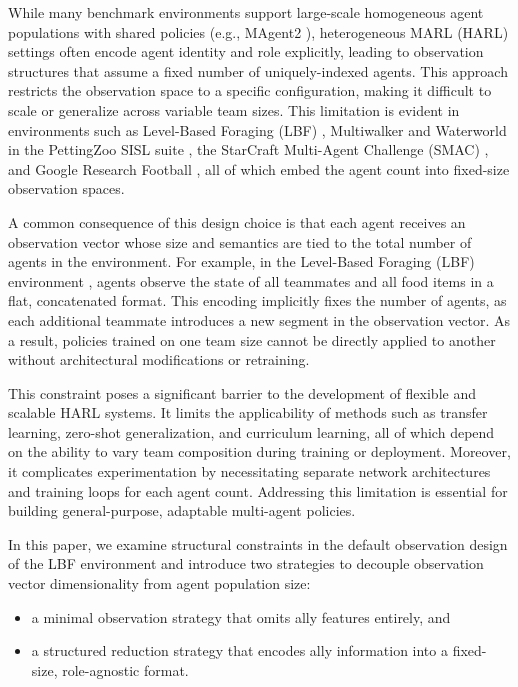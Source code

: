 \documentclass{article}
\begin{document}
While many benchmark environments support large-scale homogeneous agent populations with
shared policies (e.g., MAgent2 \cite{zheng2017}), heterogeneous MARL (HARL)
settings often encode agent identity and role explicitly, leading to observation structures
that assume a fixed number of uniquely-indexed agents. This approach restricts the observation
space to a specific configuration, making it difficult to scale or generalize across variable
team sizes. This limitation is evident in environments such as Level-Based Foraging (LBF)
\cite{papoudakis2021}, Multiwalker and Waterworld in the PettingZoo SISL suite
\cite{terry2021}, the StarCraft Multi-Agent Challenge (SMAC) \cite{samvelyan2019}, 
and Google Research Football \cite{kurach2020}, 
all of which embed the agent count into fixed-size observation spaces.

A common consequence of this design choice is that each agent receives an observation vector
whose size and semantics are tied to the total number of agents in the environment. 
For example, in the Level-Based Foraging (LBF) environment \cite{papoudakis2021}, 
agents observe the state of all teammates and all food items in a flat, concatenated format. 
This encoding implicitly fixes the number of agents, as each additional teammate introduces 
a new segment in the observation vector. As a result, policies trained on one team size cannot 
be directly applied to another without architectural modifications or retraining.

This constraint poses a significant barrier to the development of flexible and scalable HARL 
systems. It limits the applicability of methods such as transfer learning, 
zero-shot generalization, and curriculum learning, all of which depend on the ability 
to vary team composition during training or deployment. 
Moreover, it complicates experimentation by necessitating separate network architectures and 
training loops for each agent count. Addressing this limitation is essential for building 
general-purpose, adaptable multi-agent policies.

In this paper, we examine structural constraints in the default observation design of the
LBF environment and introduce two strategies to decouple observation vector dimensionality 
from agent population size:
\begin{itemize}
    \item a minimal observation strategy that omits ally features entirely, and
    \item a structured reduction strategy that encodes ally information into a fixed-size,
    role-agnostic format.
\end{itemize}
\end{document}
